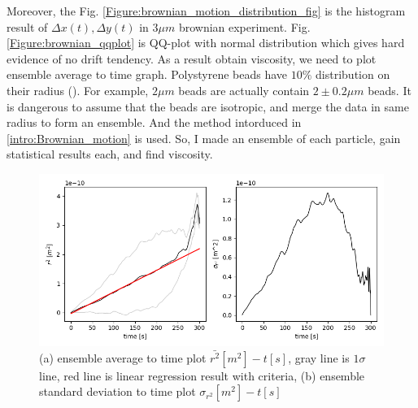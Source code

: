 \documentclass{article}
\begin{document}
 Moreover, the Fig. \ref{Figure:brownian_motion_distribution_fig} is the histogram result of $\Delta x(t), \Delta y(t)$ in $3\mu m$ brownian experiment.
 Fig. \ref{Figure:brownian_qqplot} is QQ-plot with normal distribution which gives hard evidence of no drift tendency.
 As a result obtain viscosity, we need to plot ensemble average to time graph.
 Polystyrene beads have $10\%$ distribution on their radius (\cite{polybead_spec}).
 For example, $2\mu m$ beads are actually contain $2 \pm 0.2 \mu m$ beads.
 It is dangerous to assume that the beads are isotropic, and merge the data in same radius to form an ensemble.
 And the method intorduced in \ref{intro:Brownian_motion} is used.
 So, I made an ensemble of each particle, gain statistical results each, and find viscosity.
 \begin{figure}[ht]
    \centering
    \includegraphics[width=0.8\linewidth]{../results/2um_modified_brownian_fig_0.png}
    \caption{(a) ensemble average to time plot $\bar{r^2} [m^2] - t[s]$, gray line is $1\sigma$ line, red line is linear regression result with criteria, (b) ensemble standard deviation to time plot $\sigma_{r^2} [m^2]-t[s]$}
    \label{Figure:brownian_modified_fig}
\end{figure}
\end{document}
